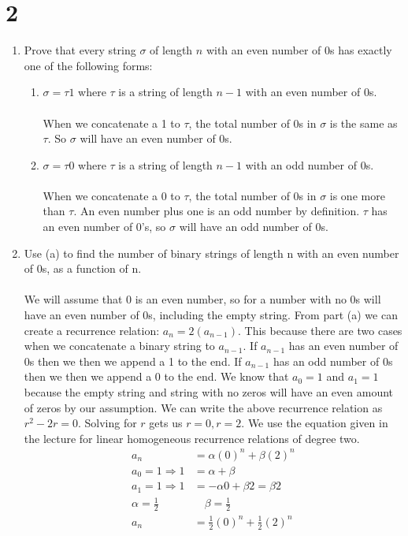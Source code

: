 \documentclass[11pt]{scrartcl}
\begin{document}
\section{2}
\begin{enumerate}[label=\alph*.]
	\item{
		Prove that every string $\sigma$ of length $n$ with an even number of 0s has exactly one of the following forms:
		\begin{enumerate}[i]
			\item{
				$\sigma=\tau 1$ where $\tau$ is a string of length $n-1$ with an even number
				of $0$s.\\\-\\
				When we concatenate a 1 to $\tau$, the total number of 0s in $\sigma$ is the same as $\tau$.
				So $\sigma$ will have an even number of 0s.
			}
			\item{
				$\sigma=\tau 0$ where $\tau$ is a string of length $n-1$ with an odd number
				of 0s.\\\-\\
				When we concatenate a 0 to $\tau$, the total number of 0s in $\sigma$ is one more than $\tau$.
				An even number plus one is an odd number by definition.
				$\tau$ has an even number of 0's, so $\sigma$ will have an odd number of 0s.
			}
		\end{enumerate}
	}
	\item{
		Use (a) to find the number of binary strings of length n with an
		even number of 0s, as a function of n.\\\-\\
		We will assume that 0 is an even number, so for a number with no 0s will have an even number of 0s, including the empty string.
		From part (a) we can create a recurrence relation: $a_n = 2(a_{n-1})$. This because there are two cases when we concatenate a 
		binary string to $a_{n-1}$. If $a_{n-1}$ has an even number of 0s then we then we append a 1 to the end. 
		If $a_{n-1}$ has an odd number of 0s then we then we append a 0 to the end. We know that $a_0 = 1$ and $a_1 = 1$ because the 
		empty string and string with no zeros will have an even amount of zeros by our assumption. 
		We can write the above recurrence relation as $r^2 - 2r = 0$. Solving for $r$ gets us $r = 0, r = 2$.
		We use the equation given in the lecture for linear homogeneous recurrence relations of degree two.
		\begin{align*}
		a_n & = \alpha(0)^n + \beta(2)^n\\
		a_{0}=1 \Rightarrow 1 & = \alpha + \beta \\
		a_{1}=1 \Rightarrow 1 & = -\alpha0 + \beta2 = \beta2\\
		\alpha =\frac12 \quad & \quad \beta = \frac12\\ 
		a_n & = \frac12(0)^n + \frac12(2)^n
		\end{align*}
	}
\end{enumerate}
\end{document}
